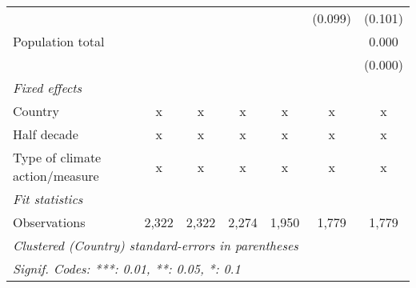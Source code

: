 \begin{tabular}{lcccccc}
                                               &         &             &         &         & (0.099)     & (0.101)\\   
   Population total                            &         &             &         &         &             & 0.000\\   
                                               &         &             &         &         &             & (0.000)\\   
   \emph{Fixed effects}\\
   Country                                     & x       & x           & x       & x       & x           & x\\  
   Half decade                                 & x       & x           & x       & x       & x           & x\\  
   Type of climate action/measure              & x       & x           & x       & x       & x           & x\\  
   \midrule \emph{Fit statistics}\\
   Observations                                & 2,322   & 2,322       & 2,274   & 1,950   & 1,779       & 1,779\\  
   \midrule
   \multicolumn{7}{l}{\emph{Clustered (Country) standard-errors in parentheses}}\\
   \multicolumn{7}{l}{\emph{Signif. Codes: ***: 0.01, **: 0.05, *: 0.1}}\\
\end{tabular}
\par\endgroup


